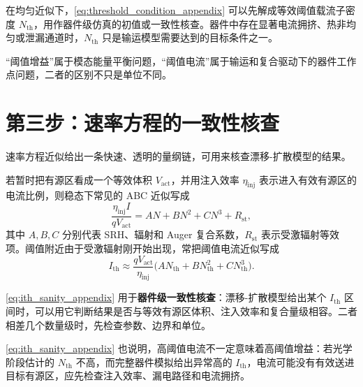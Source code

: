 在均匀近似下，\cref{eq:threshold_condition_appendix} 可以先解成等效阈值载流子密度 $N_{\mathrm{th}}$，用作器件级仿真的初值或一致性核查。器件中存在显著电流拥挤、热非均匀或泄漏通道时，$N_{\mathrm{th}}$ 只是输运模型需要达到的目标条件之一。

“阈值增益”属于模态能量平衡问题，“阈值电流”属于输运和复合驱动下的器件工作点问题，二者的区别不只是单位不同。

\section{第三步：速率方程的一致性核查}
速率方程近似给出一条快速、透明的量纲链，可用来核查漂移-扩散模型的结果。

若暂时把有源区看成一个等效体积 $V_{\mathrm{act}}$，并用注入效率 $\eta_{\mathrm{inj}}$ 表示进入有效有源区的电流比例，则稳态下常见的 ABC 近似写成
\begin{equation}
\frac{\eta_{\mathrm{inj}} I}{q V_{\mathrm{act}}}
=
A N + B N^2 + C N^3 + R_{\mathrm{st}},
\label{eq:abc_current_appendix}
\end{equation}
其中 $A,B,C$ 分别代表 SRH、辐射和 Auger 复合系数，$R_{\mathrm{st}}$ 表示受激辐射等效项。阈值附近由于受激辐射刚开始出现，常把阈值电流近似写成
\begin{equation}
I_{\mathrm{th}}
\approx
\frac{qV_{\mathrm{act}}}{\eta_{\mathrm{inj}}}
\bigl(A N_{\mathrm{th}} + B N_{\mathrm{th}}^2 + C N_{\mathrm{th}}^3\bigr).
\label{eq:ith_sanity_appendix}
\end{equation}

\cref{eq:ith_sanity_appendix} 用于\textbf{器件级一致性核查}：漂移-扩散模型给出某个 $I_{\mathrm{th}}$ 区间时，可以用它判断结果是否与等效有源区体积、注入效率和复合量级相容。二者相差几个数量级时，先检查参数、边界和单位。

\cref{eq:ith_sanity_appendix} 也说明，高阈值电流不一定意味着高阈值增益：若光学阶段估计的 $N_{\mathrm{th}}$ 不高，而完整器件模拟给出异常高的 $I_{\mathrm{th}}$，电流可能没有有效送进目标有源区，应先检查注入效率、漏电路径和电流拥挤。

